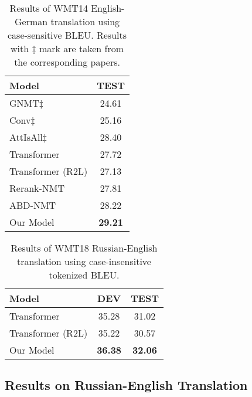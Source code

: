\documentclass[11pt,a4paper]{article}
\begin{document}
\begin{CJK*}{UTF8}{gbsn}
\begin{table}
	\centering
	\begin{tabular}{l|c}
		\hline
		Model              &    TEST               \\
		\hline
		\hline
		GNMT$\ddagger$~\cite{Wu:2016}                 &         24.61            \\
		Conv$\ddagger$~\cite{gehring2017convolutional}     &           25.16          \\
		AttIsAll$\ddagger$~\cite{vaswani2017attention}     &      28.40        \\
		\hline
		\hline
		Transformer\footnotemark[11]   &       27.72     \\
		Transformer (R2L)  &      27.13          \\
		Rerank-NMT          &     27.81      \\
		ABD-NMT           &     28.22      \\ \hline
		\hline
		Our Model         &     \textbf{29.21}     \\		
		\hline
	\end{tabular}
	\caption{Results of WMT14 English-German translation using case-sensitive BLEU. 
		Results with $\ddagger$ mark are taken from the corresponding papers.
	} \label{EN-GE}
\end{table}

\begin{table}
	\centering
	\begin{tabular}{l|cc}
		\hline
		Model              &  DEV &  TEST               \\
		\hline
		\hline
		Transformer       &  35.28     &   31.02     \\
		Transformer (R2L)  &  35.22     &    30.57          \\
		Our Model         &   \textbf{36.38}    &   \textbf{32.06}     \\	
		\hline
	\end{tabular}
	\caption{Results of WMT18 Russian-English translation using case-insensitive tokenized BLEU.
	} \label{Ru-En}
\end{table}

\subsection{Results on Russian-English Translation}


\end{CJK*}
\end{document}
